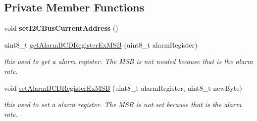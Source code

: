 \subsection*{Private Member Functions}
\begin{DoxyCompactItemize}
\item 
\mbox{\label{class_d_s3231_ae6ef1547a0d2c2653ae3fe4c0f6a62ff}} 
void {\bfseries set\+I2\+C\+Bus\+Current\+Address} ()
\item 
uint8\+\_\+t \mbox{\hyperlink{class_d_s3231_a70033a61ca1965fa0aed9af31679355f}{get\+Alarm\+B\+C\+D\+Register\+Ex\+M\+SB}} (uint8\+\_\+t alarm\+Register)
\begin{DoxyCompactList}\small\item\em this used to get a alarm register. The M\+SB is not needed because that is the alarm rate. \end{DoxyCompactList}\item 
void \mbox{\hyperlink{class_d_s3231_a79280f7161eaa45b50fe649eda9c480a}{set\+Alarm\+B\+C\+D\+Register\+Ex\+M\+SB}} (uint8\+\_\+t alarm\+Register, uint8\+\_\+t new\+Byte)
\begin{DoxyCompactList}\small\item\em this used to set a alarm register. The M\+SB is not set because that is the alarm rate. \end{DoxyCompactList}\end{DoxyCompactItemize}
